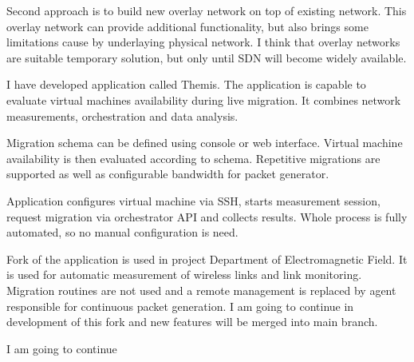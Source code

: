 Second approach is to build new overlay network on top of existing network. This overlay network can provide additional functionality, but also brings some limitations cause by underlaying physical network. I think that overlay networks are suitable temporary solution, but only until \Ac{SDN} will become widely available.







\hrulefill


I have developed application called Themis. The application is capable to evaluate virtual machines availability during live migration. It combines network measurements, orchestration and data analysis.

Migration schema can be defined using console or web interface. Virtual machine availability is then evaluated according to schema. Repetitive migrations are supported as well as configurable bandwidth for packet generator. 


Application configures virtual machine via \Ac{SSH}, starts measurement session, request migration via orchestrator \Ac{API} and collects results. Whole process is fully automated, so no manual configuration is need. 





Fork of the application is used in project Department of Electromagnetic Field. It is used for automatic measurement of wireless links and link monitoring. Migration routines are not used and a remote management is replaced by agent responsible for continuous packet generation. I am going to continue in development of this fork and new features will be merged into main branch.

I am going to continue 

